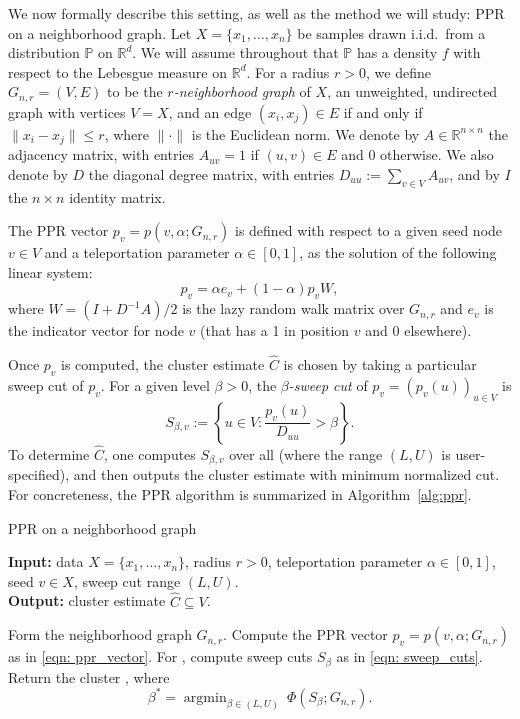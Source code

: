 \documentclass[11pt,twoside]{article}
\newcommand{\Reals}{\mathbb{R}}
\newcommand{\set}[1]{\left\{#1\right\}}
\newcommand{\1}{\mathbf{1}}
\DeclareMathOperator*{\argmin}{argmin}
\newcommand{\Rd}{\Reals^d}
\newcommand{\Pbb}{\mathbb{P}}
\newcommand{\wh}[1]{\widehat{#1}}
\begin{document}
We now formally describe this setting, as well as the method we will study: PPR on a neighborhood graph. Let $X = \{x_1,\ldots, x_n\}$ be samples drawn i.i.d.\ from a distribution
$\Pbb$ on $\Rd$. We will assume throughout that $\Pbb$ has a density $f$ with respect to the Lebesgue measure on $\Rd$. For a radius $r > 0$, we define
$G_{n,r}=(V,E)$ to be the \emph{$r$-neighborhood graph} of $X$, an
unweighted, undirected graph with vertices $V=X$, and an edge $(x_i,x_j) \in
E$ if and only if $\|x_i - x_j\| \leq r$, where $\|\cdot\|$ is the
Euclidean norm. We denote by $A \in \Reals^{n \times n}$ the adjacency
matrix, with entries $A_{uv} = 1$ if $(u,v) \in E$ and $0$ otherwise.  We
also denote by $D$ the diagonal degree matrix, with entries $D_{uu} :=
\sum_{v \in V} A_{uv}$, and by $I{}$ the $n \times n$ identity matrix.

The PPR vector $p_v = p(v,\alpha;G_{n,r})$ is defined with respect to
a given seed node $v \in V$ and a teleportation parameter $\alpha \in [0,1]$, as the solution of the following linear system:
\begin{equation}
\label{eqn: ppr_vector}
p_v = \alpha e_{v} + (1 - \alpha) p_v W,
\end{equation}
where $W = (I + D^{-1}A)/2$ is the lazy random walk matrix over
$G_{n,r}$ and $e_{v}$ is the indicator vector for node $v$ (that has a 1 in
position $v$ and 0 elsewhere).  

Once $p_v$ is computed, the cluster estimate $\wh{C}$ is chosen by taking a particular sweep cut of $p_v$. For a given level $\beta > 0$, the \emph{$\beta$-sweep cut} of $p_v = (p_v(u))_{u \in V}$ is 
\begin{equation}
\label{eqn: sweep_cuts}
S_{\beta,v} := \set{u \in V: \frac{p_v(u)}{D_{uu}} > \beta}.
\end{equation}
To determine $\wh{C}$, one computes $S_{\beta,v}$ over all  (where the range $(L,U)$ is user-specified), and then outputs the cluster estimate
\smash{$\wh{C} = S_{\beta^*}$} with minimum normalized cut.  For concreteness,
the PPR algorithm is summarized in Algorithm~\ref{alg:ppr}.   

\begin{algorithm}
	\caption{PPR on a neighborhood graph}
	\label{alg:ppr}	
	{\bfseries Input:} data $X=\{x_1,\ldots,x_n\}$, radius $r > 0$, teleportation
	parameter $\alpha \in [0,1]$, seed $v \in X$, sweep cut range $(L,U)$. \\     
	{\bfseries Output:} cluster estimate $\wh{C} \subseteq V$.
	\begin{algorithmic}[1]
		\STATE Form the neighborhood graph $G_{n,r}$.
		\STATE Compute the PPR vector $p_v=p(v, \alpha; G_{n,r})$ as in
		\eqref{eqn: ppr_vector}.  
		\STATE For , compute sweep cuts $S_{\beta}$ as in
		\eqref{eqn: sweep_cuts}. 
		\STATE Return the cluster \smash{$\wh{C} = S_{\beta^*}$}, where  
		$$
		\beta^* = \argmin_{\beta \in (L,U)}~ \Phi(S_{\beta}; G_{n,r}).
		$$
	\end{algorithmic}
\end{algorithm}
\end{document}
